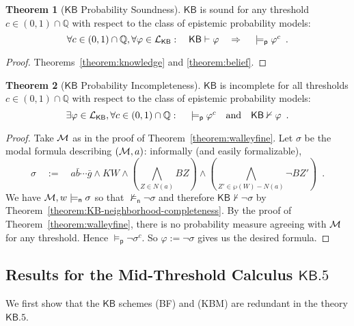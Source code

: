 \documentclass[12pt]{article}
\theoremstyle{definition}
\newtheorem{theorem}{Theorem}[section]
\newcommand{\Rat}{\mathbb{Q}}  %
\newcommand{\M}{{\cal M}}      %
\newcommand{\Lang}{{\cal L}}   %
\newcommand{\KB}{{\mathsf{KB}}}                 %
\newcommand{\KBeq}{{\mathsf{KB.5}}}             %
\newcommand{\modelsn}{\models_{\mathsf{n}}}                  %
\newcommand{\modelsp}{\models_{\mathsf{p}}}                  %
\begin{document}
\begin{theorem}[$\KB$ Probability Soundness]
  $\KB$ is sound for any threshold $c\in(0,1)\cap\Rat$ with respect to
  the class of epistemic probability models:
  \[
  \textstyle \forall c\in(0,1)
  \cap\Rat,\forall\varphi\in\Lang_\KB:\quad
  \KB\vdash\varphi
   \quad\Rightarrow\quad
  {}\modelsp\varphi^c \enspace.
  \]
\end{theorem}
\begin{proof}
  Theorems~\ref{theorem:knowledge} and \ref{theorem:belief}.
\end{proof}

\begin{theorem}[$\KB$ Probability Incompleteness]
  \label{theorem:KB-probability-incompleteness}
  $\KB$ is incomplete for all thresholds $c\in(0,1)\cap\Rat$ with
  respect to the class of epistemic probability models:
  \[
  \textstyle 
  \exists\varphi\in\Lang_\KB,
  \forall c\in(0,1)
  \cap\Rat:\quad
  {}\modelsp\varphi^c
  \quad\text{and}\quad
  \KB\nvdash\varphi\enspace.
  \]
\end{theorem}
\begin{proof}
  Take $\M$ as in the proof of Theorem~\ref{theorem:walleyfine}.  Let
  $\sigma$ be the modal formula describing $(\M,a)$: informally (and
  easily formalizable),
  \[
  \textstyle \sigma \quad:=\quad a\bar{b}\cdots\bar{g}\land
  KW\land(\bigwedge_{Z\in N(a)} BZ)\land
  (\bigwedge_{Z'\in\wp(W)-N(a)}\lnot BZ')\enspace.
  \]
  We have $\M,w\modelsn\sigma$ so that $\not\modelsn\lnot\sigma$ and
  therefore $\KB\nvdash\lnot\sigma$ by
  Theorem~\ref{theorem:KB-neighborhood-completeness}.  By the proof of
  Theorem~\ref{theorem:walleyfine}, there is no probability measure
  agreeing with $\M$ for any threshold.  Hence
  $\modelsp\lnot\sigma^c$. So $\varphi:=\lnot\sigma$ gives us the desired
  formula.
\end{proof}

\subsection{Results for the Mid-Threshold Calculus $\KBeq$}
\label{section:kbeq}

We first show that the $\KB$ schemes (BF) and (KBM) are redundant in
the theory $\KBeq$.
\end{document}
